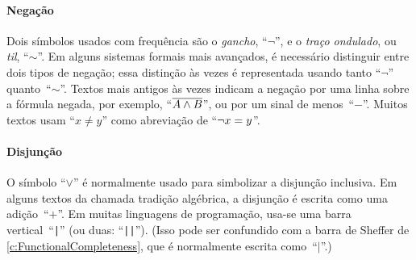\paragraph{Negação} Dois símbolos usados com frequência são o \emph{gancho}, \textquotedblleft $\neg$\textquotedblright{}, e o \emph{traço ondulado}, ou \emph{til}, \textquotedblleft $\sim$\textquotedblright{}. Em alguns sistemas formais mais avançados, é necessário distinguir entre dois tipos de negação; essa distinção às vezes é representada usando tanto \textquotedblleft $\neg$\textquotedblright{} quanto~\textquotedblleft $\sim$\textquotedblright{}. Textos mais antigos às vezes indicam a negação por uma linha sobre a fórmula negada, por exemplo, \textquotedblleft $\overline{A \wedge B}$\textquotedblright{}, ou por um sinal de menos~\textquotedblleft $-$\textquotedblright{}. Muitos textos usam \textquotedblleft $x \neq y$\textquotedblright{} como abreviação de \textquotedblleft $\neg x = y$\textquotedblright{}.

\paragraph{Disjunção} O símbolo \textquotedblleft $\vee$\textquotedblright{} é normalmente usado para simbolizar a disjunção inclusiva. Em alguns textos da chamada tradição algébrica, a disjunção é escrita como uma adição~\textquotedblleft $+$\textquotedblright{}. Em muitas linguagens de programação, usa-se uma barra vertical~\textquotedblleft \verb+|+\textquotedblright{} (ou duas: \textquotedblleft \verb+||+\textquotedblright{}). (Isso pode ser confundido com a barra de Sheffer de \cref{c:FunctionalCompleteness}, que é normalmente escrita como~\textquotedblleft $\mid$\textquotedblright{}.)

